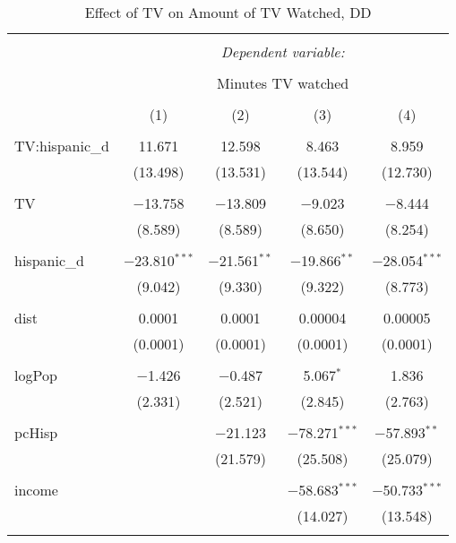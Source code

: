 
\begin{table}[!htbp] \centering 
  \caption{Effect of TV on Amount of TV Watched, DD} 
  \label{} 
\begin{tabular}{@{\extracolsep{-5pt}}lcccc} 
\\[-1.8ex]\hline 
\hline \\[-1.8ex] 
 & \multicolumn{4}{c}{\textit{Dependent variable:}} \\ 
\cline{2-5} 
\\[-1.8ex] & \multicolumn{4}{c}{Minutes TV watched} \\ 
\\[-1.8ex] & (1) & (2) & (3) & (4)\\ 
\hline \\[-1.8ex] 
 TV:hispanic\_d & 11.671 & 12.598 & 8.463 & 8.959 \\ 
  & (13.498) & (13.531) & (13.544) & (12.730) \\ 
  & & & & \\ 
 TV & $-$13.758 & $-$13.809 & $-$9.023 & $-$8.444 \\ 
  & (8.589) & (8.589) & (8.650) & (8.254) \\ 
  & & & & \\ 
 hispanic\_d & $-$23.810$^{***}$ & $-$21.561$^{**}$ & $-$19.866$^{**}$ & $-$28.054$^{***}$ \\ 
  & (9.042) & (9.330) & (9.322) & (8.773) \\ 
  & & & & \\ 
 dist & 0.0001 & 0.0001 & 0.00004 & 0.00005 \\ 
  & (0.0001) & (0.0001) & (0.0001) & (0.0001) \\ 
  & & & & \\ 
 logPop & $-$1.426 & $-$0.487 & 5.067$^{*}$ & 1.836 \\ 
  & (2.331) & (2.521) & (2.845) & (2.763) \\ 
  & & & & \\ 
 pcHisp &  & $-$21.123 & $-$78.271$^{***}$ & $-$57.893$^{**}$ \\ 
  &  & (21.579) & (25.508) & (25.079) \\ 
  & & & & \\ 
 income &  &  & $-$58.683$^{***}$ & $-$50.733$^{***}$ \\ 
  &  &  & (14.027) & (13.548) \\ 
  & & & & \\ 

\end{tabular}
\end{table}
